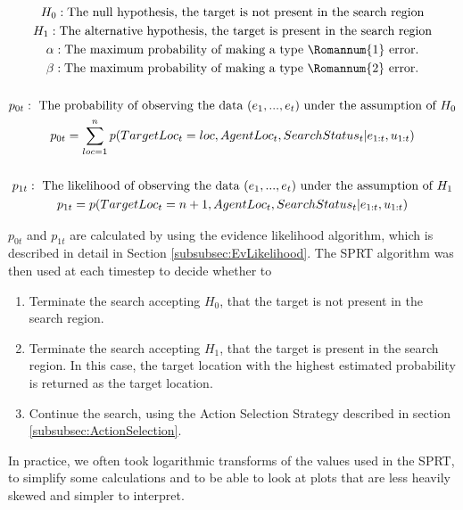 \begin{gather}\label{eqn:SPRTQuantities}
H_0 : \text{The null hypothesis, the target is not present in the search region}\nonumber
\\ \nonumber
H_1 : \text{The alternative hypothesis, the target is present in the search region}\nonumber
\\ \nonumber
\alpha : \text{The maximum probability of making a type } \Romannum{1} \text{ error.} \nonumber
\\ \nonumber
\beta : \text{The maximum probability of making a type } \Romannum{2} \text{ error.}\nonumber
\\ \nonumber
\\ \nonumber
p_{0t} : \text{ The probability of observing the data $(e_1, ..., e_t)$ under the assumption of $H_0$} \nonumber
\\ \nonumber
p_{0t}=\sum_{loc=1}^{n} p(TargetLoc_t = loc, AgentLoc_t, SearchStatus_t| e_{1:t}, u_{1:t})\nonumber
\\ \nonumber
\\ \nonumber
p_{1t} : \text{ The likelihood of observing the data $(e_1, ..., e_t)$ under the assumption of $H_1$} \nonumber
\\ \nonumber
p_{1t}=p(TargetLoc_t = n+1, AgentLoc_t, SearchStatus_t | e_{1:t}, u_{1:t})\nonumber 
\end{gather}

$p_{0t}$ and $p_{1t}$ are calculated by using the evidence likelihood algorithm, which is described in detail in Section \ref{subsubsec:EvLikelihood}. The SPRT algorithm was then used at each timestep to decide whether to 
\begin{enumerate}
    \item Terminate the search accepting $H_0$, that the target is not present in the search region.
    \item Terminate the search accepting $H_1$, that the target is present in the search region. In this case, the target location with the highest estimated probability is returned as the target location.
    \item Continue the search, using the Action Selection Strategy described in section \ref{subsubsec:ActionSelection}.
\end{enumerate}
In practice, we often took logarithmic transforms of the values used in the SPRT, to simplify some calculations and to be able to look at plots that are less heavily skewed and simpler to interpret.

